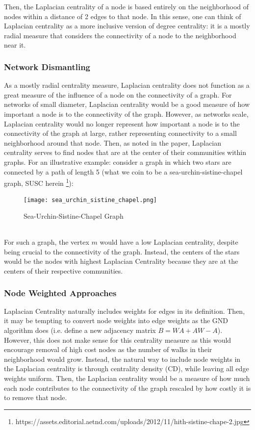 \documentclass{article}
\begin{document}
Then, the Laplacian centrality of a node is based entirely on the neighborhood of nodes within a distance of 2 edges to that node. In this sense, one can think of Laplacian centrality as a more inclusive version of degree centrality: it is a mostly radial measure that considers the connectivity of a node to the neighborhood near it.

\subsubsection{Network Dismantling}
As a mostly radial centrality measure, Laplacian centrality does not function as a great measure of the influence of a node on the connectivity of a graph. For networks of small diameter, Laplacian centrality would be a good measure of how important a node is to the connectivity of the graph. However, as networks scale, Laplacian centrality would no longer represent how important a node is to the connectivity of the graph at large, rather representing connectivity to a small neighborhood around that node. Then, as noted in the paper, Laplacian centrality serves to find nodes that are at the center of their communities within graphs. For an illustrative example: consider a graph in which two stars are connected by a path of length 5 (what we coin to be a sea-urchin-sistine-chapel graph, SUSC herein \footnote{https://assets.editorial.aetnd.com/uploads/2012/11/hith-sistine-chape-2.jpg}):
\begin{figure}[h]
\caption{Sea-Urchin-Sistine-Chapel Graph}
\centering
\texttt{[image: sea\_urchin\_sistine\_chapel.png]}
\end{figure} \\
For such a graph, the vertex $m$ would have a low Laplacian centrality, despite being crucial to the connectivity of the graph. Instead, the centers of the stars would be the nodes with highest Laplacian Centrality because they are at the centers of their respective communities.

\subsubsection{Node Weighted Approaches}
Laplacian Centrality naturally includes weights for edges in its definition. Then, it may be tempting to convert node weights into edge weights as the GND algorithm does (i.e. define a new adjacency matrix $B = WA + AW - A$). However, this does not make sense for this centrality measure as this would encourage removal of high cost nodes as the number of walks in their neighborhood would grow. Instead, the natural way to include node weights in the Laplacian centrality is through centrality density (CD), while leaving all edge weights uniform. Then, the Laplacian centrality would be a measure of how much each node contributes to the connectivity of the graph rescaled by how costly it is to remove that node.
\end{document}
